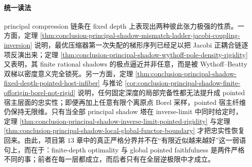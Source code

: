 \paragraph{统一读法}
principal compression 链条在 fixed depth 上表现出两种彼此张力极强的性质。一方面，定理 \ref{thm:conclusion-principal-shadow-mismatch-ladder-jacobi-coupling-inversion} 说明，最优压缩器第一次失配的梯形序列已经足以把 Jacobi 正耦合链逐项反演出来；定理 \ref{thm:conclusion-principal-shadow-wythoff-pole-density-rigidity} 又表明，其 finite rational shadows 的极点逼近并非任意，而是被 Wythoff--Beatty 双梯以密度意义完全锁死。另一方面，定理 \ref{thm:conclusion-principal-shadow-fixed-depth-pointed-host-infiber} 与推论 \ref{cor:conclusion-principal-shadow-finite-offorigin-borel-not-rigid} 说明，任何固定深度的局部完备性都无法提升成 pointed 宿主层面的忠实性；即便再加上任意有限个离原点 Borel 采样，pointed 宿主纤维仍保持无限维。只有当全部 principal shadow 塔在 inverse-limit 中同时给定时，定理 \ref{thm:conclusion-principal-shadow-inverse-limit-pointed-rigidity} 与定理 \ref{thm:conclusion-principal-shadow-local-global-functor-boundary} 才把忠实性恢复回来。由此，项目第 \(13\) 章中的真正严格分界并不在“有限近似越来越好”这一弱语句上，而在于：finite-depth optimality 与 global pointed faithfulness 是两件严格不同的事；前者在每一层都成立，而后者只有在全层逆极限中才成立。

\endinput
